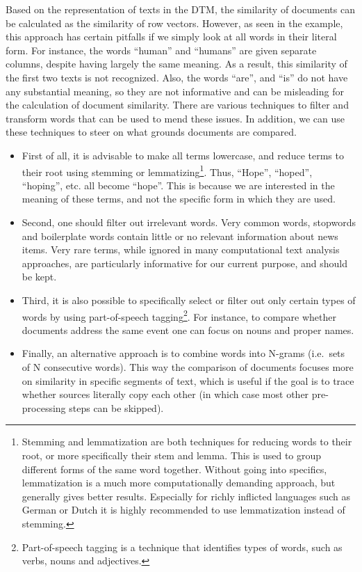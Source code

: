 \documentclass[]{article}
\let\rmarkdownfootnote\footnote%
\def\footnote{\protect\rmarkdownfootnote}
\begin{document}
Based on the representation of texts in the DTM, the similarity of
documents can be calculated as the similarity of row vectors. However,
as seen in the example, this approach has certain pitfalls if we simply
look at all words in their literal form. For instance, the words
``human'' and ``humans'' are given separate columns, despite having
largely the same meaning. As a result, this similarity of the first two
texts is not recognized. Also, the words ``are'', and ``is'' do not have
any substantial meaning, so they are not informative and can be
misleading for the calculation of document similarity. There are various
techniques to filter and transform words that can be used to mend these
issues. In addition, we can use these techniques to steer on what
grounds documents are compared.

\begin{itemize}
\item
  First of all, it is advisable to make all terms lowercase, and reduce
  terms to their root using stemming or lemmatizing\footnote{Stemming
    and lemmatization are both techniques for reducing words to their
    root, or more specifically their stem and lemma. This is used to
    group different forms of the same word together. Without going into
    specifics, lemmatization is a much more computationally demanding
    approach, but generally gives better results. Especially for richly
    inflicted languages such as German or Dutch it is highly recommended
    to use lemmatization instead of stemming.}. Thus, ``Hope'',
  ``hoped'', ``hoping'', etc. all become ``hope''. This is because we
  are interested in the meaning of these terms, and not the specific
  form in which they are used.
\item
  Second, one should filter out irrelevant words. Very common words,
  stopwords and boilerplate words contain little or no relevant
  information about news items. Very rare terms, while ignored in many
  computational text analysis approaches, are particularly informative
  for our current purpose, and should be kept.
\item
  Third, it is also possible to specifically select or filter out only
  certain types of words by using part-of-speech tagging\footnote{Part-of-speech
    tagging is a technique that identifies types of words, such as
    verbs, nouns and adjectives.}. For instance, to compare whether
  documents address the same event one can focus on nouns and proper
  names.
\item
  Finally, an alternative approach is to combine words into N-grams
  (i.e.~sets of N consecutive words). This way the comparison of
  documents focuses more on similarity in specific segments of text,
  which is useful if the goal is to trace whether sources literally copy
  each other (in which case most other pre-processing steps can be
  skipped).
\end{itemize}
\end{document}

